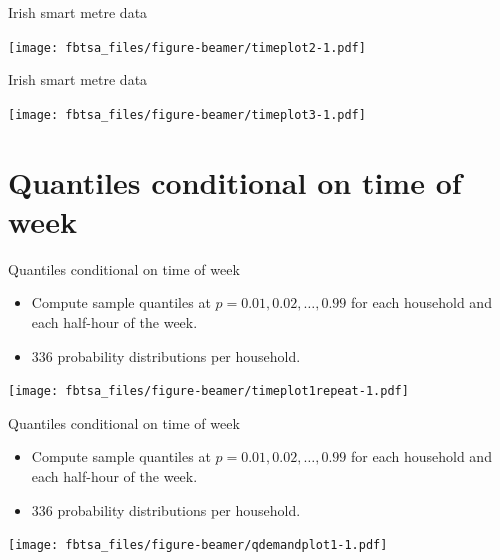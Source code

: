 \documentclass[14pt,ignorenonframetext,]{beamer}
\providecommand{\tightlist}{%
  \setlength{\itemsep}{0pt}\setlength{\parskip}{0pt}}
\begin{document}
\begin{frame}{Irish smart metre data}
\protect\hypertarget{irish-smart-metre-data-3}{}

\texttt{[image: fbtsa\_files/figure-beamer/timeplot2-1.pdf]}

\end{frame}

\begin{frame}{Irish smart metre data}
\protect\hypertarget{irish-smart-metre-data-4}{}

\texttt{[image: fbtsa\_files/figure-beamer/timeplot3-1.pdf]}

\end{frame}

\hypertarget{quantiles-conditional-on-time-of-week}{%
\section{Quantiles conditional on time of
week}\label{quantiles-conditional-on-time-of-week}}

\begin{frame}{Quantiles conditional on time of week}
\protect\hypertarget{quantiles-conditional-on-time-of-week-1}{}

\fontsize{11}{13}\sf

\begin{itemize}
\tightlist
\item
  Compute sample quantiles at \(p=0.01,0.02,\dots, 0.99\) for each
  household and each half-hour of the week.
\item
  \(336\) probability distributions per household.
\end{itemize}

\texttt{[image: fbtsa\_files/figure-beamer/timeplot1repeat-1.pdf]}

\end{frame}

\begin{frame}{Quantiles conditional on time of week}
\protect\hypertarget{quantiles-conditional-on-time-of-week-2}{}

\fontsize{11}{13}\sf

\begin{itemize}
\tightlist
\item
  Compute sample quantiles at \(p=0.01,0.02,\dots, 0.99\) for each
  household and each half-hour of the week.
\item
  \(336\) probability distributions per household.
\end{itemize}

\texttt{[image: fbtsa\_files/figure-beamer/qdemandplot1-1.pdf]}

\end{frame}
\end{document}
